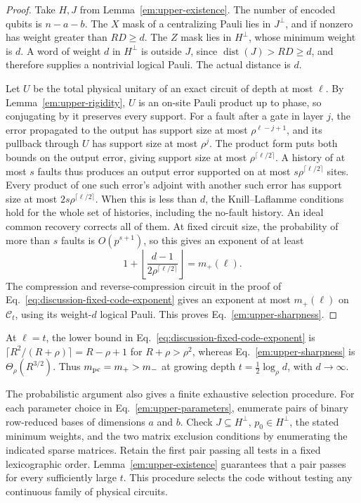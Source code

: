 \documentclass[aps,prl,reprint,notitlepage,nofootinbib,nobibnotes]{revtex4-2}
\begin{document}
\begin{proof}
Take \(H,J\) from Lemma~\ref{em:upper-existence}. The number of encoded qubits is \(n-a-b\). The \(X\) mask of a centralizing Pauli lies in \(J^\perp\), and if nonzero has weight greater than \(RD\ge d\). The \(Z\) mask lies in \(H^\perp\), whose minimum weight is \(d\). A word of weight \(d\) in \(H^\perp\) is outside \(J\), since \(\operatorname{dist}(J)>RD\ge d\), and therefore supplies a nontrivial logical Pauli. The actual distance is \(d\).

Let \(U\) be the total physical unitary of an exact circuit of depth at most \(\ell\). By Lemma~\ref{em:upper-rigidity}, \(U\) is an on-site Pauli product up to phase, so conjugating by it preserves every support. For a fault after a gate in layer \(j\), the error propagated to the output has support size at most \(\rho^{\ell-j+1}\), and its pullback through \(U\) has support size at most \(\rho^j\). The product form puts both bounds on the output error, giving support size at most \(\rho^{\lceil\ell/2\rceil}\). A history of at most \(s\) faults thus produces an output error supported on at most \(s\rho^{\lceil\ell/2\rceil}\) sites. Every product of one such error's adjoint with another such error has support size at most \(2s\rho^{\lceil\ell/2\rceil}\). When this is less than \(d\), the Knill--Laflamme conditions hold for the whole set of histories, including the no-fault history. An ideal common recovery corrects all of them. At fixed circuit size, the probability of more than \(s\) faults is \(O(p^{s+1})\), so this gives an exponent of at least
\[
 1+\left\lfloor\frac{d-1}{2\rho^{\lceil\ell/2\rceil}}\right\rfloor
 =m_+(\ell).
\]
The compression and reverse-compression circuit in the proof of Eq.~\eqref{eq:discussion-fixed-code-exponent} gives an exponent at most \(m_+(\ell)\) on \(\mathcal C_t\), using its weight-\(d\) logical Pauli. This proves Eq.~\eqref{em:upper-sharpness}.
\end{proof}

At \(\ell=t\), the lower bound in Eq.~\eqref{eq:discussion-fixed-code-exponent} is \(\lceil R^2/(R+\rho)\rceil=R-\rho+1\) for \(R+\rho>\rho^2\), whereas Eq.~\eqref{em:upper-sharpness} is \(\Theta_\rho(R^{3/2})\). Thus \(m_{\rm pc}=m_+>m_-\) at growing depth \(t=\tfrac12\log_\rho d\), with \(d\to\infty\).

The probabilistic argument also gives a finite exhaustive selection procedure. For each parameter choice in Eq.~\eqref{em:upper-parameters}, enumerate pairs of binary row-reduced bases of dimensions \(a\) and \(b\). Check \(J\subseteq H^\perp\), \(p_0\in H^\perp\), the stated minimum weights, and the two matrix exclusion conditions by enumerating the indicated sparse matrices. Retain the first pair passing all tests in a fixed lexicographic order. Lemma~\ref{em:upper-existence} guarantees that a pair passes for every sufficiently large \(t\). This procedure selects the code without testing any continuous family of physical circuits.
\end{document}
